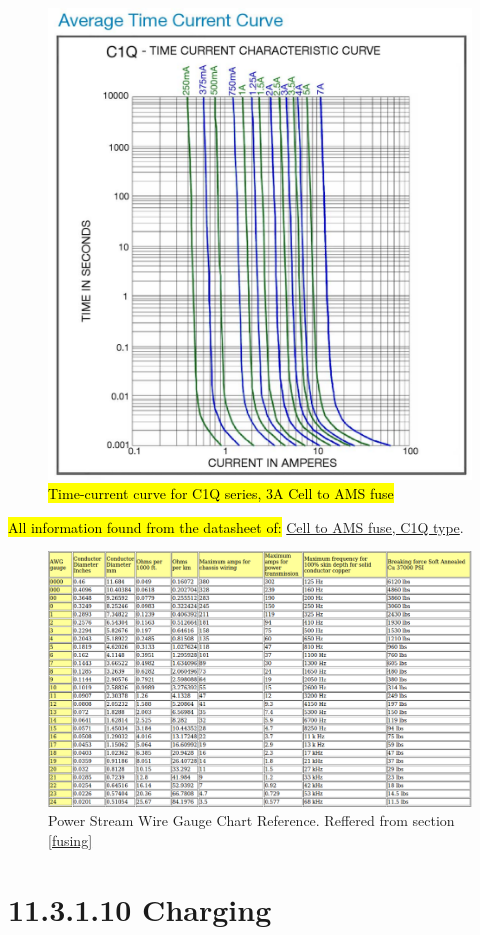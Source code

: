 \documentclass{article}
\DeclareRobustCommand{\hlr}[1]{{\sethlcolor{red}\hl{#1}}}
\begin{document}
\begin{figure}[H]
    \centering
    \includegraphics[width = 0.6 \textwidth]{amsfusecurve}
    \caption{\hlr{Time-current curve for C1Q series, 3A Cell to AMS fuse}}
    \label{amsfusecurve}
\end{figure}

\hlr{All information found from the datasheet of: }
\href{http://belfuse.com/pdfs/C1Q.pdf}{Cell to AMS fuse, C1Q type}.


\begin{figure}
    \centering
    \includegraphics[width = 1 \textwidth]{WireGaugeChart}
    \caption{Power Stream Wire Gauge Chart Reference. Reffered from section \ref{fusing}}
    \label{AWGchart}
\end{figure}

\section*{11.3.1.10 Charging}
\end{document}
